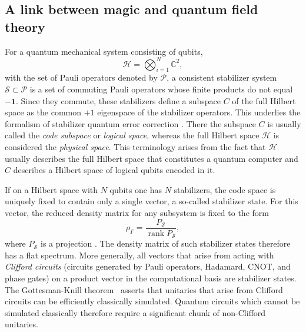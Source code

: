 \documentclass[aps,pra,reprint,superscriptaddress]{revtex4-2}
\newcommand{\LS}[1]{{\textcolor{red}{#1}}}
\newcommand{\je}[1]{{\color{cyan}#1}} %
\newcommand{\cH}{{\mathcal H}}
\newcommand{\cP}{{\mathcal P}}
\newcommand{\cS}{{\mathcal S}}
\newcommand{\id}{\mathbf 1}
\newcommand{\lb}
[1]{{\color{red}$\big[\![$ \raisebox{.7pt}{LB}\!\!\:\raisebox{-.7pt}{}: \emph{#1}$\ ]\!\big]$}}
\theoremstyle{definition}
\theoremstyle{remark}
\begin{document}
\subsection{A link between magic and quantum field theory}
For a quantum mechanical system consisting of qubits,
\begin{equation}
  \cH=\bigotimes_{i=1}^{N}\mathbb{C}^{2},
\end{equation}
with the set of Pauli operators denoted by $\cP$, a consistent stabilizer system $\cS \subset \cP$ is a set of commuting Pauli operators whose
finite products do not equal $-\id$.  Since they 
commute, these stabilizers define a subspace $C$ of the full Hilbert space as the
common $+1$ eigenspace of the stabilizer operators. This underlies the formalism of stabilizer quantum error correction \cite{Gottesman:1997zz}.  There the subspace $C$ is usually called the \emph{code subspace} or \emph{logical space}, whereas the full Hilbert space $\cH$ is considered the \emph{physical space}. This terminology arises from the fact that $\cH$ usually describes the full Hilbert space that constitutes a quantum computer and $C$ describes a Hilbert space of logical qubits encoded in it.

If on a Hilbert space with $N$ qubits one has $N$ stabilizers, the code space is uniquely fixed to contain only a single vector, a so-called stabilizer state. 
For this vector, the reduced density matrix for any subsystem
is fixed to the form 
\begin{equation}\label{eq:projection_state}
  \rho_{\Gamma}=\frac{P_{\cS}}{\operatorname{rank}P_{\cS}},
\end{equation}
where $P_{\cS}$ is a projection \cite{Fattal:2004frh}.
The density matrix of such stabilizer states therefore has a flat spectrum.
More generally, all vectors that arise from acting with \emph{Clifford circuits} (circuits generated by Pauli operators, Hadamard, CNOT, and phase gates) on a product vector in the computational basis are stabilizer states. The Gottesman-Knill theorem~\cite{gottesman1998heisenberg} asserts that unitaries that arise from  Clifford circuits can be efficiently classically simulated. Quantum circuits which cannot be simulated classically therefore require a significant chunk of non-Clifford unitaries.

\end{document}
